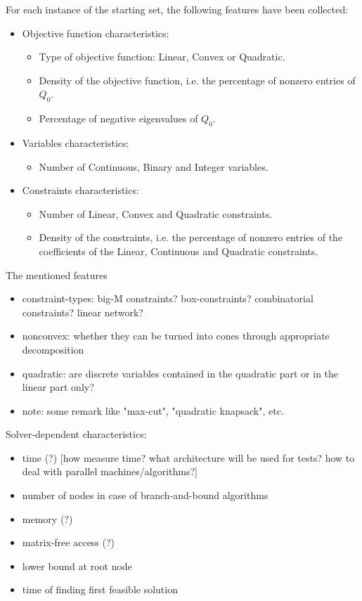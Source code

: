 For each instance of the starting set, the following features have been collected:
\begin{itemize}
\item Objective function characteristics:
\begin{itemize}
\item Type of objective function:  Linear, Convex or Quadratic.
\item Density of the objective function, i.e. the percentage of nonzero entries of $Q_0$.
\item Percentage of negative eigenvalues of $Q_0$.
\end{itemize}
\item Variables characteristics:
\begin{itemize}
\item Number of Continuous, Binary and Integer variables.
\end{itemize}
\item Constraints characteristics:
\begin{itemize}
\item Number of Linear, Convex and Quadratic constraints.
\item Density of the constraints, i.e. the percentage of nonzero entries of the coefficients of the Linear, Continuous and Quadratic constraints.
\end{itemize}
\end{itemize}

The mentioned features
\begin{itemize}
\item constraint-types: big-M constraints? box-constraints? combinatorial constraints? linear network?
\item nonconvex: whether they can be turned into cones through appropriate decomposition
\item quadratic: are discrete variables contained in the quadratic part or in the linear part only?
\item note: some remark like "max-cut", "quadratic knapsack", etc.
\end{itemize}





Solver-dependent characteristics:
\begin{itemize}
\item time (?) [how measure time? what architecture will be used for tests? how to deal with parallel machines/algorithms?]
\item number of nodes in case of branch-and-bound algorithms
\item memory (?)
\item matrix-free access (?)
\item lower bound at root node
\item time of finding first feasible solution
\end{itemize}


